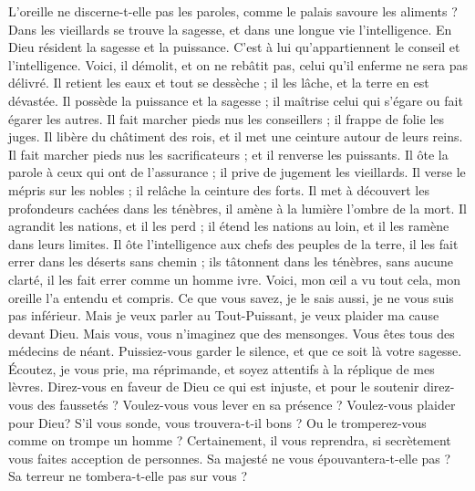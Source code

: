 \begin{multicols}{2}
L'oreille ne discerne-t-elle pas les paroles, comme le palais savoure les aliments ?
Dans les vieillards se trouve la sagesse, et dans une longue vie l'intelligence.
En Dieu résident la sagesse et la puissance. C'est à lui qu'appartiennent le conseil et l'intelligence.
Voici, il démolit, et on ne rebâtit pas, celui qu'il enferme ne sera pas délivré.
Il retient les eaux et tout se dessèche ; il les lâche, et la terre en est dévastée.
Il possède la puissance et la sagesse ; il maîtrise celui qui s'égare ou fait égarer les autres.
Il fait marcher pieds nus les conseillers ; il frappe de folie les juges.
Il libère du châtiment des rois, et il met une ceinture autour de leurs reins.
Il fait marcher pieds nus les sacrificateurs ; et il renverse les puissants.
Il ôte la parole à ceux qui ont de l'assurance ; il prive de jugement les vieillards.
Il verse le mépris sur les nobles ; il relâche la ceinture des forts.
Il met à découvert les profondeurs cachées dans les ténèbres, il amène à la lumière l'ombre de la mort.
Il agrandit les nations, et il les perd ; il étend les nations au loin, et il les ramène dans leurs limites.
Il ôte l'intelligence aux chefs des peuples de la terre, il les fait errer dans les déserts sans chemin ;
ils tâtonnent dans les ténèbres, sans aucune clarté, il les fait errer comme un homme ivre.
\VerseOne{}Voici, mon œil a vu tout cela, mon oreille l'a entendu et compris.
Ce que vous savez, je le sais aussi, je ne vous suis pas inférieur.
Mais je veux parler au Tout-Puissant, je veux plaider ma cause devant Dieu.
Mais vous, vous n'imaginez que des mensonges. Vous êtes tous des médecins de néant.
Puissiez-vous garder le silence, et que ce soit là votre sagesse.
Écoutez, je vous prie, ma réprimande, et soyez attentifs à la réplique de mes lèvres.
Direz-vous en faveur de Dieu ce qui est injuste, et pour le soutenir direz-vous des faussetés ?
Voulez-vous vous lever en sa présence ? Voulez-vous plaider pour Dieu?
S'il vous sonde, vous trouvera-t-il bons ? Ou le tromperez-vous comme on trompe un homme ?
Certainement, il vous reprendra, si secrètement vous faites acception de personnes.
Sa majesté ne vous épouvantera-t-elle pas ? Sa terreur ne tombera-t-elle pas sur vous ?

\end{multicols}
